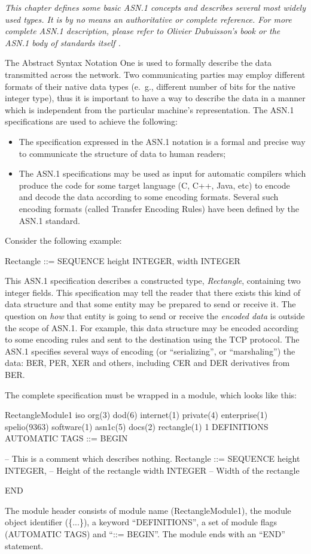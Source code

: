 \documentclass[english,oneside,12pt]{book}
\begin{document}
\emph{This chapter defines some basic ASN.1 concepts and describes
several most widely used types. It is by no means an authoritative
or complete reference. For more complete ASN.1 description, please
refer to Olivier Dubuisson's book \cite{Dub00} or the ASN.1 body
of standards itself \cite{ITU-T/ASN.1}.}

The Abstract Syntax Notation One is used to formally describe the
data transmitted across the network. Two communicating parties may employ
different formats of their native data types (e.~g., different number
of bits for the native integer type), thus it is important to have
a way to describe the data in a manner which is independent from the
particular machine's representation.
The ASN.1 specifications are used to achieve the following:
\begin{itemize}
\item The specification expressed in the ASN.1 notation is a formal and
precise way to communicate the structure of data to human readers;
\item The ASN.1 specifications may be used as input for automatic compilers
which produce the code for some target language (C, C++, Java, etc)
to encode and decode the data according to some encoding formats.
Several such encoding formats (called Transfer Encoding Rules)
have been defined by the ASN.1 standard.
\end{itemize}
Consider the following example:
\begin{asn}
Rectangle ::= SEQUENCE {
    height  INTEGER,
    width   INTEGER
}
\end{asn}
This ASN.1 specification describes a constructed type, \emph{Rectangle},
containing two integer fields. This specification may tell the reader
that there exists this kind of data structure and that some entity
may be prepared to send or receive it. The question on \emph{how}
that entity is going to send or receive the \emph{encoded data} is
outside the scope of ASN.1. For example, this data structure may be
encoded according to some encoding rules and sent to the destination
using the TCP protocol. The ASN.1 specifies several ways of encoding
(or ``serializing'', or ``marshaling'') the data: BER, PER, XER
and others, including CER and DER derivatives from BER.

The complete specification must be wrapped in a module, which looks
like this:
\begin{asn}
RectangleModule1
    { iso org(3) dod(6) internet(1) private(4)
      enterprise(1) spelio(9363) software(1)
      asn1c(5) docs(2) rectangle(1) 1 }
    DEFINITIONS AUTOMATIC TAGS ::=
BEGIN

-- This is a comment which describes nothing.
Rectangle ::= SEQUENCE {
    height  INTEGER,        -- Height of the rectangle
    width   INTEGER         -- Width of the rectangle
}

END
\end{asn}
The module header consists of module name (RectangleModule1), the
module object identifier (\{...\}), a keyword ``DEFINITIONS'', a
set of module flags (AUTOMATIC TAGS) and ``::= BEGIN''. The module
ends with an ``END'' statement.
\end{document}
